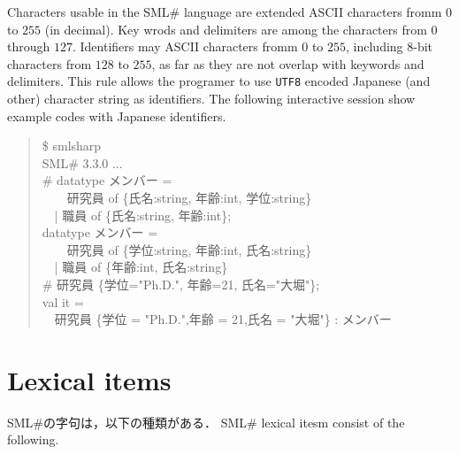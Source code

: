 \documentclass{jbook}
\newcommand{\txt}[2]{#2}
\newcommand{\smlsharp}{SML\#}
\newcommand{\version}{3.3.0}
\newcommand{\code}[1]{\mbox{\large\tt #1}}
\newcommand{\myem}{\mbox{\ \ }}
\newenvironment{program}{\begin{quote}\begin{tt}}%
                        {\end{tt}\end{quote}}
\begin{document}
\else%
	Characters usable in the \smlsharp{} language are extended 
ASCII characters fromm $0$ to $255$ (in decimal).
	Key wrods and delimiters are among the characters from 
$0$ through $127$.
	Identifiers may ASCII characters fromm $0$ to $255$, including
8-bit characters from $128$ to $255$, as far as they are not overlap with 
keywords and delimiters.
	This rule allows the programer to use \code{UTF8} encoded
Japanese (and other) character string as identifiers.
	The following interactive session show example codes with
Japanese identifiers.
\begin{program}
  \$ smlsharp\\
  SML\# \version{} ...\\
  \# datatype メンバー = 
\\
   \myem\myem  研究員 of \{氏名:string, 年齢:int, 学位:string\} 
\\
   \myem | 職員 of \{氏名:string, 年齢:int\};
\\
  datatype メンバー =
\\
   \myem\myem 研究員 of \{学位:string, 年齢:int, 氏名:string\}
\\
  \myem | 職員 of \{年齢:int, 氏名:string\}
\\
  \# 研究員 \{学位="Ph.D.", 年齢=21, 氏名="大堀"\};
\\
  val it =
\\
  \myem 研究員 \{学位 = "Ph.D.",年齢 = 21,氏名 = "大堀"\} : メンバー
\end{program}
\fi%

\section{\txt{字句集合}{Lexical items}}
\label{sec:lexicalItems}
\ifjp%
	\smlsharp{}の字句は，以下の種類がある．
\else%
	\smlsharp{} lexical itesm consist of the following.
\fi%
\end{document}
